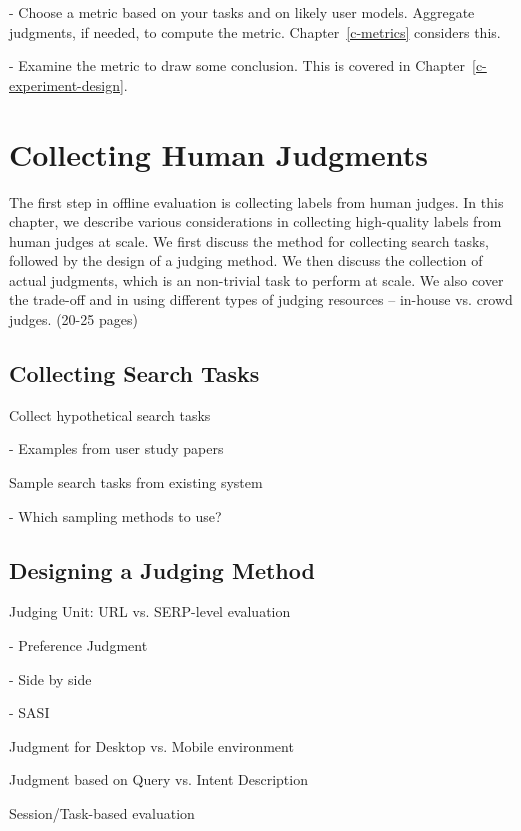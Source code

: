 \documentclass[openany]{now} %
\newcommand{\newpar}{\bigskip\noindent}
\begin{document}
- Choose a metric based on your tasks and on likely user models. Aggregate judgments, if needed, to compute the metric. Chapter~\ref{c-metrics} considers this.

- Examine the metric to draw some conclusion. This is covered in Chapter~\ref{c-experiment-design}.

\chapter{Collecting Human Judgments}
\label{c-human-judgment}

The first step in offline evaluation is collecting labels from human judges. In this chapter, we describe various considerations in collecting high-quality labels from human judges at scale. We first discuss the method for collecting search tasks, followed by the design of a judging method. We then discuss the collection of actual judgments, which is an non-trivial task to perform at scale. We also cover the trade-off and in using different types of judging resources -- in-house vs. crowd judges. (20-25 pages)

\section{Collecting Search Tasks}

Collect hypothetical search tasks

- Examples from user study papers

\newpar
Sample search tasks from existing system

- Which sampling methods to use? \cite{Baeza-Yates:2015}

\section{Designing a Judging Method}

Judging Unit: URL vs. SERP-level evaluation

- Preference Judgment  \cite{Chandar2013} \cite{CarteretteBCD08}

- Side by side \cite{Thomas2006} \cite{Kim:2013}

- SASI \cite{Bailey2010} 

\newpar
Judgment for Desktop vs. Mobile environment \cite{Verma:2016:CRMD}

\newpar
Judgment based on Query vs. Intent Description \cite{Yilmaz:2014:EID}

\newpar
Session/Task-based evaluation \cite{Moraveji:2011} \cite{Xu:2009}
\end{document}
